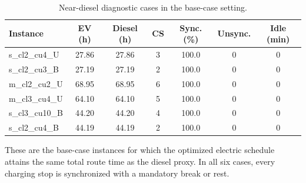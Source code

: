 \documentclass[3p,11pt,authoryear]{elsarticle}  %
\begin{document}
\begin{table}[!htbp]
\centering
\caption{Near-diesel diagnostic cases in the base-case setting.}
\label{tab:near_diesel_cases}
\begin{threeparttable}
\small
\setlength{\tabcolsep}{3.5pt}
\renewcommand{\arraystretch}{1.1}
\begin{tabular}{
p{4.0cm}
S[table-format=2.2]
S[table-format=2.2]
S[table-format=1.0]
S[table-format=3.1]
S[table-format=1.0]
S[table-format=3.0]
}
\toprule
Instance & {EV (h)} & {Diesel (h)} & {CS} & {Sync. (\%)} & {Unsync.} & {Idle (min)} \\
\midrule
s\_cl2\_cu4\_U & 27.86 & 27.86 & 3 & 100.0 & 0 & 0 \\
s\_cl2\_cu3\_B   & 27.19 & 27.19 & 2 & 100.0 & 0 & 0 \\
m\_cl2\_cu2\_U   & 68.95 & 68.95 & 6 & 100.0 & 0 & 0 \\
m\_cl3\_cu4\_U   & 64.10 & 64.10 & 5 & 100.0 & 0 & 0 \\
s\_cl3\_cu10\_B  & 44.20 & 44.20 & 4 & 100.0 & 0 & 0 \\
s\_cl2\_cu4\_B   & 44.19 & 44.19 & 2 & 100.0 & 0 & 0 \\
\bottomrule
\end{tabular}
\begin{tablenotes}[flushleft]
\footnotesize
\item These are the base-case instances for which the optimized electric schedule attains the same total route time as the diesel proxy. In all six cases, every charging stop is synchronized with a mandatory break or rest.
\end{tablenotes}
\end{threeparttable}
\end{table}
\end{document}
